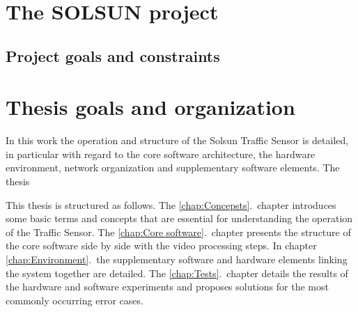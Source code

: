 \section{The SOLSUN project}
\subsection{Project goals and constraints}

\section{Thesis goals and organization}
In this work the operation and structure of the Solsun Traffic Sensor is detailed, in particular with regard to the core software architecture, the hardware environment, network organization and supplementary software elements.
The thesis

This thesis is structured as follows.
The \ref{chap:Concepsts}.~chapter introduces some basic terms and concepts that are essential for understanding the operation of the Traffic Sensor. 
The \ref{chap:Core software}.~chapter presents the structure of the core software side by side with the video processing steps.
In chapter \ref{chap:Environment}.~the supplementary software and hardware elements linking the system together are detailed.
The \ref{chap:Tests}.~chapter details the results of the hardware and software experiments and proposes solutions for the most commonly occurring error cases.